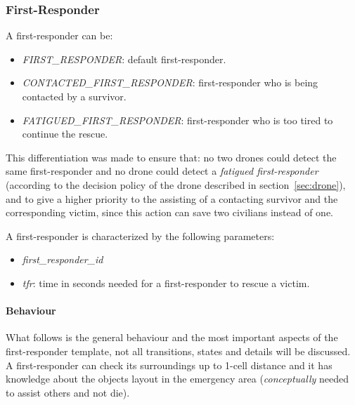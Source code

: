 \subsubsection{First-Responder}
A first-responder can be:
\begin{itemize}
	\item \textit{FIRST\_RESPONDER}: default first-responder.
	\item \textit{CONTACTED\_FIRST\_RESPONDER}: first-responder who is being contacted by a survivor.
	\item \textit{FATIGUED\_FIRST\_RESPONDER}: first-responder who is too tired to continue the rescue.
\end{itemize}

\noindent
This differentiation was made to ensure that: no two drones could detect the same first-responder and no drone could detect a \textit{fatigued first-responder} (according to the decision policy of the drone described in section~\ref{sec:drone}), and to give a higher priority to the assisting of a contacting survivor and the corresponding victim, since this action can save two civilians instead of one.\newline

\noindent
A first-responder is characterized by the following parameters:
\begin{itemize}
	\item \textit{first\_responder\_id}
	\item \textit{tfr}: time in seconds needed for a first-responder to rescue a victim.
\end{itemize}

\paragraph{Behaviour}
What follows is the general behaviour and the most important aspects of the first-responder template, not all transitions, states and details will be discussed.\newline
A first-responder can check its surroundings up to 1-cell distance and it has knowledge about the objects layout in the emergency area (\textit{conceptually} needed to assist others and not die).


